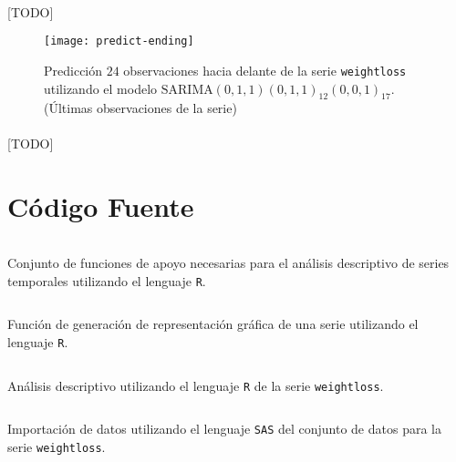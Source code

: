 \documentclass[a4paper, spanish]{article}
\begin{document}
    \paragraph{}
    [TODO]

    \begin{figure}[htb!]
      \centering
      \texttt{[image: predict-ending]}
      \caption{Predicción $24$ observaciones hacia delante de la serie \texttt{weightloss} utilizando el modelo $\text{SARIMA}(0, 1, 1)(0, 1, 1)_{12}(0, 0, 1)_{17}$. (Últimas observaciones de la serie)}
      \label{img:predict_ending}
    \end{figure}

    \paragraph{}
    [TODO]

  \appendix
  \section{Código Fuente}
  \label{sec:code}

    \begin{listing}[H]
      \centering
      \inputminted{R}{./res/code/functions.r}
      \caption{Conjunto de funciones de apoyo necesarias para el análisis descriptivo de series temporales utilizando el lenguaje \texttt{R}.}
      \label{code:functions_r}
    \end{listing}

    \begin{listing}[H]
      \centering
      \inputminted{R}{./res/code/plotting.r}
      \caption{Función de generación de representación gráfica de una serie utilizando el lenguaje \texttt{R}.}
      \label{code:plotting_r}
    \end{listing}

    \begin{listing}[H]
      \centering
      \inputminted{R}{./res/code/descriptive.r}
      \caption{Análisis descriptivo utilizando el lenguaje \texttt{R} de la serie \texttt{weightloss}.}
      \label{code:descriptive_r}
    \end{listing}

    \begin{listing}[H]
      \centering
      \inputminted{SAS}{./res/code/import.SAS}
      \caption{Importación de datos utilizando el lenguaje \texttt{SAS} del conjunto de datos para la serie \texttt{weightloss}.}
      \label{code:import_sas}
    \end{listing}
\end{document}
